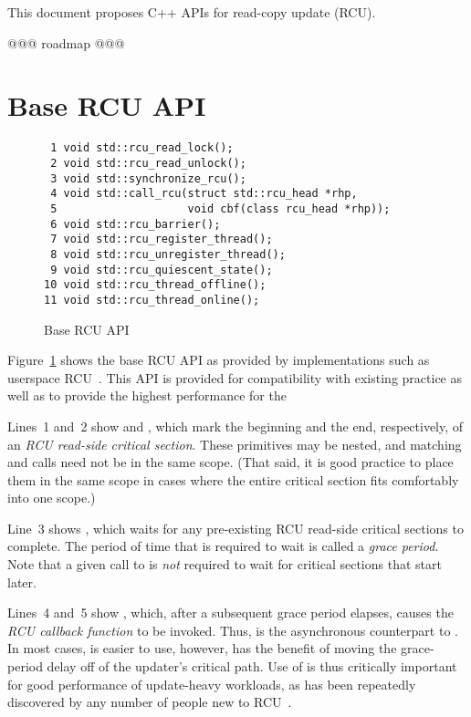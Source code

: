\documentclass[letterpaper,twocolumn,10pt]{article}
\begin{document}
This document proposes C++ APIs for read-copy update (RCU).

@@@ roadmap @@@

\section{Base RCU API}
\label{sec:Base RCU API}

\begin{figure}[tbp]
{ \scriptsize
\begin{verbatim}
 1 void std::rcu_read_lock();
 2 void std::rcu_read_unlock();
 3 void std::synchronize_rcu();
 4 void std::call_rcu(struct std::rcu_head *rhp,
 5                    void cbf(class rcu_head *rhp));
 6 void std::rcu_barrier();
 7 void std::rcu_register_thread();
 8 void std::rcu_unregister_thread();
 9 void std::rcu_quiescent_state();
10 void std::rcu_thread_offline();
11 void std::rcu_thread_online();
\end{verbatim}
}
\caption{Base RCU API}
\label{fig:Base RCU API}
\end{figure}

Figure~\ref{fig:Base RCU API}
shows the base RCU API as provided by implementations such as
userspace RCU~\cite{MathieuDesnoyers2009URCU,PaulMcKenney2013LWNURCU}.
This API is provided for compatibility with existing practice as
well as to provide the highest performance for the

Lines~1 and~2 show  and ,
which mark the beginning and the end, respectively, of an \emph{RCU read-side
critical section}.
These primitives may be nested, and matching 
and  calls need not be in the same scope.
(That said, it is good practice to place them in the same scope
in cases where the entire critical section fits comfortably into
one scope.)

Line~3 shows , which waits for any pre-existing
RCU read-side critical sections to complete.
The period of time that  is required to wait is
called a \emph{grace period}.
Note that a given call to  is \emph{not} required to
wait for critical sections that start later.

Lines~4 and~5 show , which, after a subsequent grace period
elapses, causes the  \emph{RCU callback function} to be invoked.
Thus,  is the asynchronous counterpart to
.
In most cases,  is easier to use, however, 
has the benefit of moving the grace-period delay off of the updater's
critical path.
Use of  is thus critically important for good performance of
update-heavy workloads, as has been repeatedly discovered by any number of
people new to RCU~\cite{PaulEMcKenney2015ReadMostly}.
\end{document}
